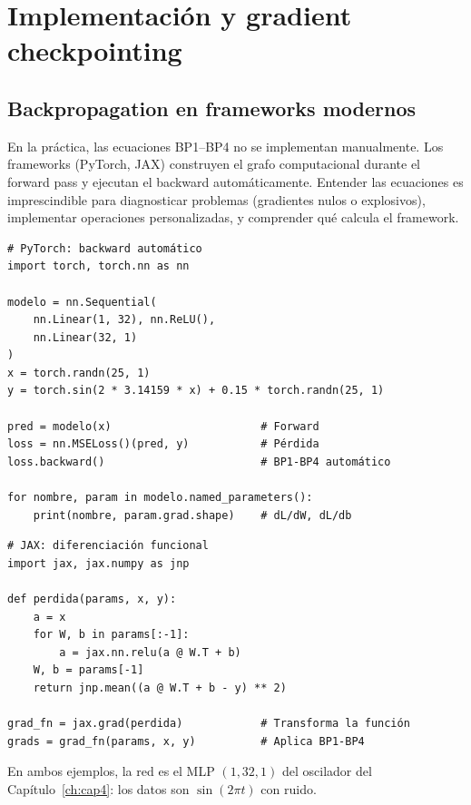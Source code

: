 \section{Implementación y gradient checkpointing}
\label{sec:implementacion}


\subsection{Backpropagation en frameworks modernos}
\label{subsec:frameworks}

En la práctica, las ecuaciones BP1–BP4 no se implementan manualmente. Los
frameworks (PyTorch, JAX) construyen el grafo computacional durante el
forward pass y ejecutan el backward automáticamente. Entender las
ecuaciones es imprescindible para diagnosticar problemas (gradientes nulos
o explosivos), implementar operaciones personalizadas, y comprender qué
calcula el framework.

\begin{verbatim}
# PyTorch: backward automático
import torch, torch.nn as nn

modelo = nn.Sequential(
    nn.Linear(1, 32), nn.ReLU(),
    nn.Linear(32, 1)
)
x = torch.randn(25, 1)
y = torch.sin(2 * 3.14159 * x) + 0.15 * torch.randn(25, 1)

pred = modelo(x)                       # Forward
loss = nn.MSELoss()(pred, y)           # Pérdida
loss.backward()                        # BP1-BP4 automático

for nombre, param in modelo.named_parameters():
    print(nombre, param.grad.shape)    # dL/dW, dL/db
\end{verbatim}

\begin{verbatim}
# JAX: diferenciación funcional
import jax, jax.numpy as jnp

def perdida(params, x, y):
    a = x
    for W, b in params[:-1]:
        a = jax.nn.relu(a @ W.T + b)
    W, b = params[-1]
    return jnp.mean((a @ W.T + b - y) ** 2)

grad_fn = jax.grad(perdida)            # Transforma la función
grads = grad_fn(params, x, y)          # Aplica BP1-BP4
\end{verbatim}

En ambos ejemplos, la red es el MLP $(1, 32, 1)$ del oscilador del
Capítulo~\ref{ch:cap4}: los datos son $\sin(2\pi t)$ con ruido.

